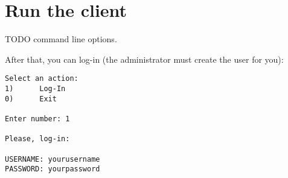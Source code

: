 \section{Run the client}

TODO command line options.

After that, you can log-in (the administrator must create the user for you):

\begin{verbatim}
Select an action:
1)      Log-In
0)      Exit

Enter number: 1

Please, log-in:

USERNAME: yourusername
PASSWORD: yourpassword
\end{verbatim}
